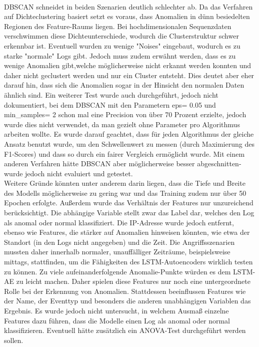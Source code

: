\documentclass[a4paper,12pt]{article}
\begin{document}
	\\[0.5em]
	DBSCAN schneidet in beiden Szenarien deutlich schlechter ab. Da das Verfahren  auf Dichteclustering basiert setzt es voraus, dass Anomalien in dünn besiedelten Regionen des Feature-Raums liegen. Bei hochdimensionalen Sequenzdaten verschwimmen diese Dichteunterschiede, wodurch die Clusterstruktur schwer erkennbar ist. Eventuell wurden zu wenige "Noises" eingebaut, wodurch es zu starke "normale" Logs gibt. Jedoch muss zudem erwähnt werden, dass es zu wenige Anomalien gibt,welche möglicherweise nicht erkannt werden konnten und daher nicht geclustert werden und nur ein Cluster entsteht. Dies deutet aber eher darauf hin, dass sich die Anomalien sogar in der Hinsicht den normalen Daten ähnlich sind. Ein weiterer Test wurde auch durchgeführt, jedoch nicht dokumentiert, bei dem DBSCAN mit den Parametern eps= 0.05 und min\_samples= 2 schon mal eine Precision von über 70 Prozent erzielte, jedoch wurde dies nicht verwendet, da man gezielt ohne Parameter pro Algorithmus arbeiten wollte. Es wurde darauf geachtet, dass für jeden Algorithmus der gleiche Ansatz benutzt wurde, um den Schwellenwert zu messen (durch Maximierung des F1-Scores) und dass so durch ein fairer Vergleich ermöglicht wurde. Mit einem anderen Verfahren hätte DBSCAN aber möglicherweise besser abgeschnitten- wurde jedoch nicht evaluiert und getestet.
	\\[0.5em]
	Weitere Gründe könnten unter anderem darin liegen, dass die Tiefe und Breite des Modells möglicherweise zu gering war und das Training zudem nur über 50 Epochen erfolgte. Außerdem wurde das Verhältnis der Features nur unzureichend berücksichtigt. Die abhängige Variable stellt zwar das Label dar, welches den Log als anomal oder normal klassifiziert. Die IP-Adresse wurde jedoch entfernt, ebenso wie Features, die stärker auf Anomalien hinweisen könnten, wie etwa der Standort (in den Logs nicht angegeben) und die Zeit. Die Angriffsszenarien mussten daher innerhalb normaler, unauffälliger Zeiträume, beispielsweise mittags, stattfinden, um die Fähigkeiten des LSTM-Autoencoders wirklich testen zu können. Zu viele aufeinanderfolgende Anomalie-Punkte würden es dem LSTM-AE zu leicht machen. Daher spielen diese Features nur noch eine untergeordnete Rolle bei der Erkennung von Anomalien. Stattdessen beeinflussen Features wie der Name, der Eventtyp und besonders die anderen unabhängigen Variablen das Ergebnis. Es wurde jedoch nicht untersucht, in welchem Ausmaß einzelne Features dazu führen, dass die Modelle einen Log als anomal oder normal klassifizieren. Eventuell hätte zusätzlich ein ANOVA-Test durchgeführt werden sollen.
	
\end{document}
